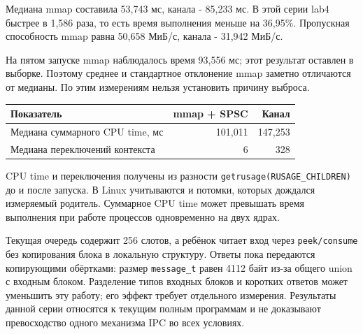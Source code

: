 \documentclass[12pt,a4paper,oneside,fleqn]{article}
\begin{document}
Медиана mmap составила 53,743 мс, канала - 85,233 мс.
В этой серии lab4 быстрее в 1,586 раза, то есть время выполнения
меньше на 36,95\%. Пропускная способность mmap равна
50,658 МиБ/с, канала - 31,942 МиБ/с.

\begin{center}
\end{center}

На пятом запуске mmap наблюдалось время 93,556 мс; этот результат оставлен
в выборке. Поэтому среднее и стандартное отклонение mmap заметно отличаются
от медианы. По этим измерениям нельзя установить причину выброса.

\begin{center}\small
\begin{tabular}{lrr}
\toprule Показатель & mmap + SPSC & Канал\\\midrule
Медиана суммарного CPU time, мс & 101,011 & 147,253\\
Медиана переключений контекста & 6 & 328\\
\bottomrule\end{tabular}\end{center}
CPU time и переключения получены из разности
\texttt{getrusage(RUSAGE\_CHILDREN)} до и после запуска. В Linux учитываются
и потомки, которых дождался измеряемый родитель. Суммарное CPU time может
превышать время выполнения при работе процессов одновременно на двух ядрах.

Текущая очередь содержит 256 слотов, а ребёнок читает вход через
\texttt{peek/consume} без копирования блока в локальную структуру.
Ответы пока передаются копирующими обёртками: размер \texttt{message\_t}
равен 4112 байт из-за общего union с входным блоком. Разделение типов входных
блоков и коротких ответов может уменьшить эту работу; его эффект требует
отдельного измерения. Результаты данной серии относятся к текущим полным
программам и не доказывают превосходство одного механизма IPC во всех условиях.
\end{document}
